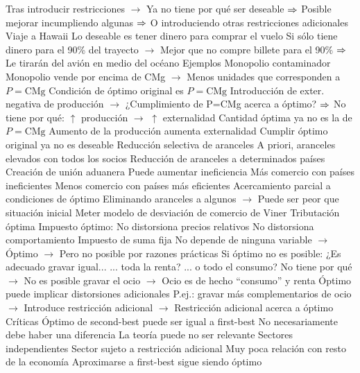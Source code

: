 \documentclass{nuevotema}
\begin{document}
\begin{esquemal}
				\4[] Tras introducir restricciones
				\4[] $\to$ Ya no tiene por qué ser deseable
				\4[] $\then$ Posible mejorar incumpliendo algunas
				\4[] $\then$ O introduciendo otras restricciones adicionales
				\4 Viaje a Hawaii
				\4[] Lo deseable es tener dinero para comprar el vuelo
				\4[] Si sólo tiene dinero para el 90\% del trayecto
				\4[] $\to$ Mejor que no compre billete para el 90\%
				\4[] $\then$ Le tirarán del avión en medio del océano
		\2 Ejemplos
			\3 Monopolio contaminador
				\4 Monopolio vende por encima de CMg
				\4[] $\to$ Menos unidades que corresponden a $P=\text{CMg}$
				\4 Condición de óptimo original es $P=\text{CMg}$
				\4 Introducción de exter. negativa de producción
				\4[] $\to$ ¿Cumplimiento de P=CMg acerca a óptimo?
				\4[] $\then$ No tiene por qué: $\uparrow$ producción $\to$ $\uparrow$ externalidad
				\4 Cantidad óptima ya no es la de $P=\text{CMg}$
				\4[$\then$] Aumento de la producción aumenta externalidad
				\4[$\then$] Cumplir óptimo original ya no es deseable
			\3 Reducción selectiva de aranceles
				\4[1.] A priori, aranceles elevados con todos los socios
				\4[2.] Reducción de aranceles a determinados países
				\4[3.] Creación de unión aduanera
				\4[$\then$] Puede aumentar ineficiencia
				\4[$\then$] Más comercio con países ineficientes
				\4[$\then$] Menos comercio con países más eficientes
				\4 Acercamiento parcial a condiciones de óptimo
				\4[] Eliminando aranceles a algunos
				\4[] $\to$ Puede ser peor que situación inicial
				\4 Meter modelo de desviación de comercio de Viner
			\3 Tributación óptima
				\4 Impuesto óptimo:
				\4[] No distorsiona precios relativos
				\4[] No distorsiona comportamiento
				\4 Impuesto de suma fija
				\4[] No depende de ninguna variable
				\4[] $\to$ Óptimo
				\4[] $\to$ Pero no posible por razones prácticas
				\4 Si óptimo no es posible:
				\4[] ¿Es adecuado gravar igual...
				\4[] ... toda la renta?
				\4[] ... o todo el consumo?
				\4[] No tiene por qué
				\4[] $\to$ No es posible gravar el ocio
				\4[] $\to$ Ocio es de hecho ``consumo'' y renta
				\4 Óptimo puede implicar distorsiones adicionales
				\4[] P.ej.: gravar más complementarios de ocio
				\4[] $\to$ Introduce restricción adicional
				\4[] $\to$ Restricción adicional acerca a óptimo
		\2 Críticas
			\3 Óptimo de second-best puede ser igual a first-best
				\4 No necesariamente debe haber una diferencia
				\4 La teoría puede no ser relevante
			\3 Sectores independientes
				\4 Sector sujeto a restricción adicional
				\4[] Muy poca relación con resto de la economía
				\4[$\then$] Aproximarse a first-best sigue siendo óptimo

\end{esquemal}
\end{document}
